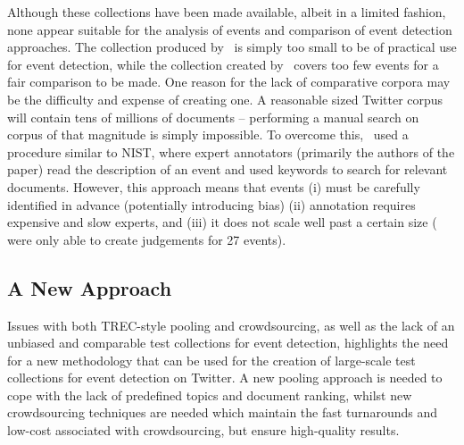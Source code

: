Although these collections have been made available, albeit in a limited fashion, none appear suitable for the analysis of events and comparison of event detection approaches.
The collection produced by~\citeauthor{Becker:2012:ICP:2124295.2124360} is simply too small to be of practical use for event detection, while the collection created by~\citeauthor{Petrovic:2012:UPI:2382029.2382072} covers too few events for a fair comparison to be made.
One reason for the lack of comparative corpora may be the difficulty and expense of creating one.
A reasonable sized Twitter corpus will contain tens of millions of documents -- performing a manual search on corpus of that magnitude is simply impossible.
To overcome this,~\citeauthor{Petrovic:2012:UPI:2382029.2382072} used a procedure similar to NIST, where expert annotators (primarily the authors of the paper) read the description of an event and used keywords to search for relevant documents.
However, this approach means that events (i) must be carefully identified in advance (potentially introducing bias) (ii) annotation requires expensive and slow experts, and (iii) it does not scale well past a certain size (\citeauthor{Petrovic:2012:UPI:2382029.2382072} were only able to create judgements for 27 events).

\subsection{A New Approach}
Issues with both TREC-style pooling and crowdsourcing, as well as the lack of an unbiased and comparable test collections for event detection, highlights the need for a new methodology that can be used for the creation of large-scale test collections for event detection on Twitter.
A new pooling approach is needed to cope with the lack of predefined topics and document ranking, whilst new crowdsourcing techniques are needed which maintain the fast turnarounds and low-cost associated with crowdsourcing, but ensure high-quality results.

